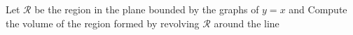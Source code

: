 Let $\mathcal{R}$ be the region in the plane bounded by the graphs of $y=x$ and   Compute the volume of the region formed by revolving $\mathcal{R}$ around the line 